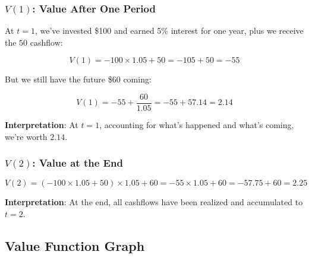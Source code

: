 \documentclass[
  letterpaper,
]{scrbook}
\begin{document}
\subsubsection{\texorpdfstring{\(V(1)\): Value After One
Period}{V(1): Value After One Period}}\label{v1-value-after-one-period}

At \(t=1\), we've invested \$100 and earned 5\% interest for one year,
plus we receive the \(50\) cashflow:

\[
V(1) = -100 \times 1.05 + 50 = -105 + 50 = -55
\]

But we still have the future \$60 coming:

\[
V(1) = -55 + \frac{60}{1.05} = -55 + 57.14 = 2.14
\]

\textbf{Interpretation}: At \(t=1\), accounting for what's happened and
what's coming, we're worth \(2.14\).

\subsubsection{\texorpdfstring{\(V(2)\): Value at the
End}{V(2): Value at the End}}\label{v2-value-at-the-end}

\[
V(2) = (-100 \times 1.05 + 50) \times 1.05 + 60 = -55 \times 1.05 + 60 = -57.75 + 60 = 2.25
\]

\textbf{Interpretation}: At the end, all cashflows have been realized
and accumulated to \(t=2\).

\subsection{Value Function Graph}\label{value-function-graph}
\end{document}
